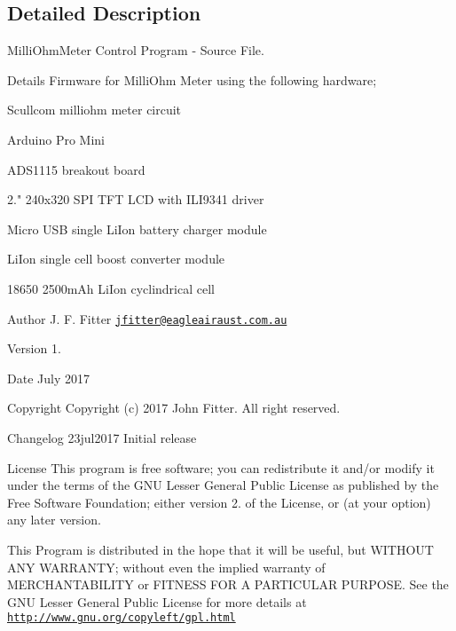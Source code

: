 \subsection{Detailed Description}
\begin{DoxyParagraph}{Milli\-Ohm\-Meter Control Program -\/ Source File.}

\end{DoxyParagraph}
\begin{DoxyParagraph}{Details}
Firmware for Milli\-Ohm Meter using the following hardware; \begin{DoxyItemize}
\item Scullcom milliohm meter circuit \item Arduino Pro Mini \item A\-D\-S1115 breakout board \item 2." 240x320 S\-P\-I T\-F\-T L\-C\-D with I\-L\-I9341 driver \item Micro U\-S\-B single Li\-Ion battery charger module \item Li\-Ion single cell boost converter module \item 18650 2500m\-Ah Li\-Ion cyclindrical cell\end{DoxyItemize}

\end{DoxyParagraph}
\begin{DoxyAuthor}{Author}
J. F. Fitter \href{mailto:jfitter@eagleairaust.com.au}{\tt jfitter@eagleairaust.\-com.\-au} 
\end{DoxyAuthor}
\begin{DoxyVersion}{Version}
1. 
\end{DoxyVersion}
\begin{DoxyDate}{Date}
July 2017 
\end{DoxyDate}
\begin{DoxyCopyright}{Copyright}
Copyright (c) 2017 John Fitter. All right reserved.
\end{DoxyCopyright}
\begin{DoxyParagraph}{Changelog}
23jul2017 Initial release
\end{DoxyParagraph}
\begin{DoxyParagraph}{License}
This program is free software; you can redistribute it and/or modify it under the terms of the G\-N\-U Lesser General Public License as published by the Free Software Foundation; either version 2. of the License, or (at your option) any later version. 
\end{DoxyParagraph}
\begin{DoxyParagraph}{}
This Program is distributed in the hope that it will be useful, but W\-I\-T\-H\-O\-U\-T A\-N\-Y W\-A\-R\-R\-A\-N\-T\-Y; without even the implied warranty of M\-E\-R\-C\-H\-A\-N\-T\-A\-B\-I\-L\-I\-T\-Y or F\-I\-T\-N\-E\-S\-S F\-O\-R A P\-A\-R\-T\-I\-C\-U\-L\-A\-R P\-U\-R\-P\-O\-S\-E. See the G\-N\-U Lesser General Public License for more details at \href{http://www.gnu.org/copyleft/gpl.html}{\tt http\-://www.\-gnu.\-org/copyleft/gpl.\-html} 
\end{DoxyParagraph}
